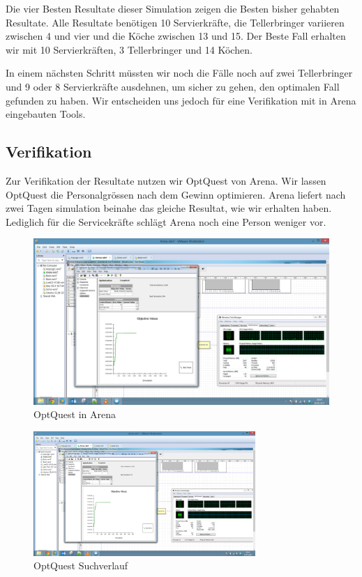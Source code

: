 \documentclass[ngerman,a4paper,12pt]{scrreprt}
\begin{document}
			Die vier Besten Resultate dieser Simulation zeigen die Besten bisher gehabten Resultate. Alle Resultate benötigen 10 Servierkräfte, die Tellerbringer variieren zwischen 4 und vier und die Köche zwischen 13 und 15. Der Beste Fall erhalten wir mit 10 Servierkräften, 3 Tellerbringer und 14 Köchen.
			
			In einem nächsten Schritt müssten wir noch die Fälle noch auf zwei Tellerbringer und 9 oder 8 Servierkräfte ausdehnen, um sicher zu gehen, den optimalen Fall gefunden zu haben. Wir entscheiden uns jedoch für eine Verifikation mit in Arena eingebauten Tools.
		
		\subsection{Verifikation}
			Zur Verifikation der Resultate nutzen wir OptQuest von Arena. Wir lassen OptQuest die Personalgrössen nach dem Gewinn optimieren. Arena liefert nach zwei Tagen simulation beinahe das gleiche Resultat, wie wir erhalten haben. Lediglich für die Servicekräfte schlägt Arena noch eine Person weniger vor.
			\begin{figure}[H]
				\centering
					\includegraphics[width=\textwidth]{img/OptQuest.PNG}
					\caption[OptQuest in Arena]{OptQuest in Arena}
					\label{optQuestInArena}
			\end{figure}
			
			\begin{figure}[H]
				\centering
					\includegraphics[trim=10cm 3.5cm 18.5cm 12.5cm, clip=true,width=0.75\textwidth]{img/OptQuest.PNG}
					\caption[OptQuest Suchverlauf]{OptQuest Suchverlauf}
					\label{optQuestSuchverlauf}
			\end{figure}
			
\end{document}
